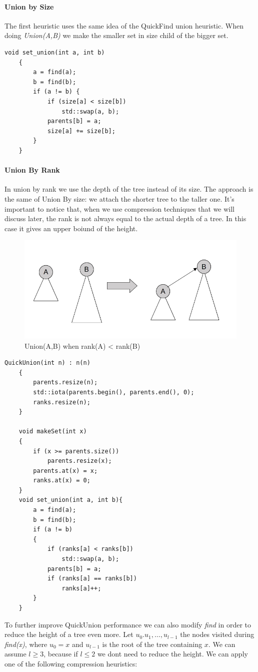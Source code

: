 \documentclass{article}
\begin{document}
\paragraph{Union by Size}
The first heuristic uses the same idea of the QuickFind union heuristic. When doing \emph{Union(A,B)}
we make the smaller set in size child of the bigger set.
\begin{lstlisting}[caption=Union by size implementation, label=quu]
    void set_union(int a, int b)
    {
        a = find(a);
        b = find(b);
        if (a != b) {
            if (size[a] < size[b])
                std::swap(a, b);
            parents[b] = a;
            size[a] += size[b];
        }
    }

\end{lstlisting}
\paragraph{Union By Rank} In union by rank we use the depth of the tree instead
of its size. The approach is the same of Union By size: we attach the shorter tree
to the taller one. It's important to notice that, when we use compression techniques that we will discuss later, the rank is not always equal to the actual depth of a tree. 
In this case it gives an upper boiund of the height.  
\begin{figure}[h!]
    \includegraphics[width=0.9\linewidth]{img/urank.png}
    \caption{Union(A,B) when rank(A) < rank(B)}
    \label{fig:urank}
\end{figure}
\begin{lstlisting}[caption=QuickUnion using Union by Rank]
    QuickUnion(int n) : n(n)
    {
        parents.resize(n);
        std::iota(parents.begin(), parents.end(), 0);
        ranks.resize(n);
    }

    void makeSet(int x)
    {
        if (x >= parents.size())
            parents.resize(x);
        parents.at(x) = x;
        ranks.at(x) = 0;
    }
    void set_union(int a, int b){
        a = find(a);
        b = find(b);
        if (a != b)
        {
            if (ranks[a] < ranks[b])
                std::swap(a, b);
            parents[b] = a;
            if (ranks[a] == ranks[b])
                ranks[a]++;
        }
    }
\end{lstlisting}
To further improve QuickUnion performance we can also modify \emph{find} in order to reduce the height of a tree
even more. Let $u_0. u_1, \dots, u_{l-1}$ the nodes visited during \emph{find(x)}, where $u_0 = x$ and $u_{l-1}$ is
the root of the tree containing $x$. We can assume $l \geq 3$, because if $l\leq 2$ we dont need to reduce the height.
We can apply one of the following compression heuristics:
\end{document}
